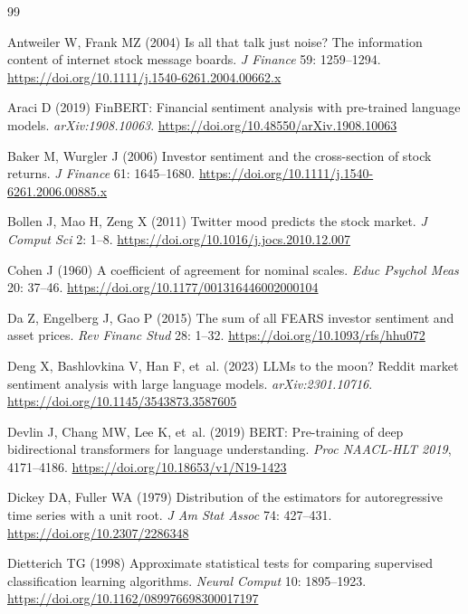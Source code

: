 \documentclass[12pt,a4paper]{article}
\begin{document}
\begin{thebibliography}{99}
\setlength{\itemsep}{2pt}

Antweiler W, Frank MZ (2004) Is all that talk just noise? The information content of
internet stock message boards. \emph{J Finance} 59: 1259--1294. \url{https://doi.org/10.1111/j.1540-6261.2004.00662.x}

Araci D (2019) FinBERT: Financial sentiment analysis with pre-trained language
models. \emph{arXiv:1908.10063}. \url{https://doi.org/10.48550/arXiv.1908.10063}

Baker M, Wurgler J (2006) Investor sentiment and the cross-section of stock returns.
\emph{J Finance} 61: 1645--1680. \url{https://doi.org/10.1111/j.1540-6261.2006.00885.x}

Bollen J, Mao H, Zeng X (2011) Twitter mood predicts the stock market. \emph{J Comput
Sci} 2: 1--8. \url{https://doi.org/10.1016/j.jocs.2010.12.007}

Cohen J (1960) A coefficient of agreement for nominal scales. \emph{Educ Psychol
Meas} 20: 37--46. \url{https://doi.org/10.1177/001316446002000104}

Da Z, Engelberg J, Gao P (2015) The sum of all FEARS investor sentiment and asset
prices. \emph{Rev Financ Stud} 28: 1--32. \url{https://doi.org/10.1093/rfs/hhu072}

Deng X, Bashlovkina V, Han F, et~al. (2023) LLMs to the moon? Reddit market sentiment
analysis with large language models. \emph{arXiv:2301.10716}. \url{https://doi.org/10.1145/3543873.3587605}

Devlin J, Chang MW, Lee K, et~al. (2019) BERT: Pre-training of deep bidirectional
transformers for language understanding. \emph{Proc NAACL-HLT 2019}, 4171--4186. \url{https://doi.org/10.18653/v1/N19-1423}

Dickey DA, Fuller WA (1979) Distribution of the estimators for autoregressive time
series with a unit root. \emph{J Am Stat Assoc} 74: 427--431. \url{https://doi.org/10.2307/2286348}

Dietterich TG (1998) Approximate statistical tests for comparing supervised
classification learning algorithms. \emph{Neural Comput} 10: 1895--1923. \url{https://doi.org/10.1162/089976698300017197}


\end{thebibliography}
\end{document}
